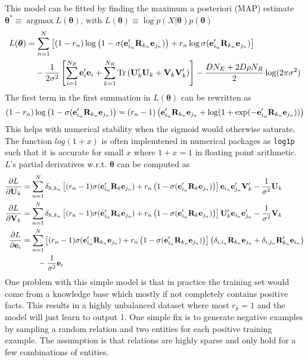 \documentclass[a4paper, 11pt, fleqn]{article}
\newcommand{\btheta}[0]{\boldsymbol{\theta}}
\begin{document}
This model can be fitted by finding the maximum a posteriori (MAP)
estimate $\btheta^* \equiv \operatorname{argmax} L(\btheta)$, with
$L(\btheta) \equiv \log p(X\vert \btheta)p(\btheta)$
\begin{align}
  \label{eqn:loglike}
  L(\btheta) &= \sum_{n=1}^{N}\left[ (1 - r_n) \log \left(1 -
    \sigma({\bf e}'_{i_n}{\bf R}_{k_n}{\bf e}_{j_n})\right) + r_n \log
  \sigma({\bf e}'_{i_n}{\bf R}_{k_n}{\bf e}_{j_n})\right] \nonumber \\
  &\quad - \frac{1}{2\sigma^2}\left[ \sum_{i=1}^{N_E} {\bf e}_i'{\bf e}_i
  +\sum_{k=1}^{N_R}
  \text{Tr}\left({\bf U}_k'{\bf U}_k + {\bf V}_k{\bf V}_k'\right)\right]
  - \frac{DN_E + 2D\rho N_R}{2}\log(2\pi\sigma^2)
\end{align}
The first term in the first summation in $L(\btheta)$ can be rewritten as
\begin{align}
(1 - r_n) \log \left(1 -
    \sigma({\bf e}'_{i_n}{\bf R}_{k_n}{\bf e}_{j_n})\right) =
  (r_n - 1)\left( {\bf e}'_{i_n}{\bf R}_{k_n}{\bf e}_{j_n} +
  \log(1 + \exp(-{\bf e}'_{i_n}{\bf R}_{k_n}{\bf e}_{j_n})) \right)
\end{align}
This helps with numerical stability when the sigmoid would otherwise
saturate. The function $log(1 + x)$ is often implemtened in numerical
packages as \texttt{log1p} such that it is accurate for small $x$
where $1 + x = 1$ in floating point arithmetic. $L$'s partial
derivatives w.r.t. $\btheta$ can be computed as
\begin{align}
  \label{eqn:objective}
  \frac{\partial L}{\partial {\bf U}_k} &=
  \sum_{n=1}^{N}\delta_{k,k_n}\left[(r_n - 1)\sigma({\bf
      e}'_{i_n}{\bf R}_{k}{\bf e}_{j_n}) + r_n \left( 1 - \sigma({\bf
        e}'_{i_n}{\bf R}_{k}{\bf e}_{j_n}) \right)\right]
  {\bf e}_{i_n}{\bf e}'_{j_n}{\bf V}'_k- \frac{1}{\sigma^{2}}{\bf U}_k \\
  \frac{\partial L}{\partial {\bf V}_k} &=
  \sum_{n=1}^{N}\delta_{k,k_n}\left[(r_n - 1)\sigma({\bf
      e}'_{i_n}{\bf R}_{k}{\bf e}_{j_n}) + r_n \left( 1 - \sigma({\bf
        e}'_{i_n}{\bf R}_{k}{\bf e}_{j_n}) \right)\right]
  {\bf U}'_k{\bf e}_{i_n}{\bf e}'_{j_n} - \frac{1}{\sigma^{2}}{\bf V}_k \\
  \frac{\partial L}{\partial {\bf e}_i} &=
  \sum_{n=1}^{N}\left[(r_n - 1)\sigma({\bf
      e}'_{i_n}{\bf R}_{k_n}{\bf e}_{j_n}) + r_n \left( 1 - \sigma({\bf
        e}'_{i_n}{\bf R}_{k_n}{\bf e}_{j_n}) \right)\right] \left( \delta_{i,i_n}{\bf R}_{k_n}
    {\bf e}_{j_n} + \delta_{i,j_n}{\bf R}'_{k_n} {\bf
      e}_{i_n}\right)\nonumber \\
  &\qquad - \frac{1}{\sigma^2} {\bf e}_i
\end{align}
\noindent One problem with this simple model is that in practice the
training set would come from a knowledge base which mostly if not
completely contains positive facts. This results in a highly
unbalanced dataset where most $r_k = 1$ and the model will just learn
to output 1. One simple fix is to generate negative examples by
sampling a random relation and two entities for each positive training
example. The assumption is that relations are highly sparse and only
hold for a few combinations of entities.
\end{document}
